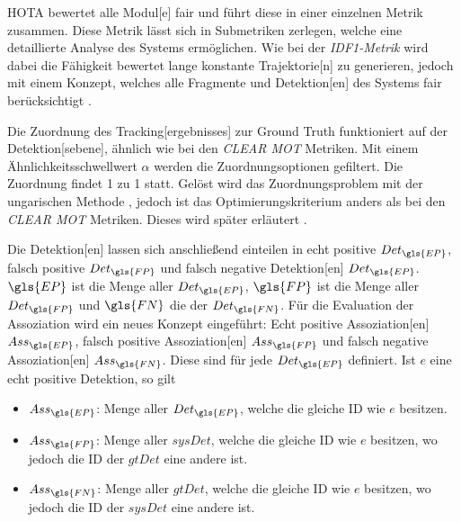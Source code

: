 \gls{HOTA} bewertet alle \gls{Modul}[e] fair und führt diese in einer einzelnen Metrik zusammen. Diese Metrik lässt sich in Submetriken zerlegen, welche eine detaillierte Analyse des Systems ermöglichen. Wie bei der \textit{\gls{IDF1}-Metrik} wird dabei die Fähigkeit bewertet lange konstante \gls{Trajektorie}[n] zu generieren, jedoch mit einem Konzept, welches alle Fragmente und \gls{Detektion}[en] des Systems fair berücksichtigt \cite{HOTA}. \par

Die Zuordnung des \gls{Tracking}[ergebnisses] zur \gls{Ground Truth} funktioniert auf der \gls{Detektion}[sebene], ähnlich wie bei den \textit{\acrshort{CLEAR} \gls{MOT}} Metriken. Mit einem Ähnlichkeitsschwellwert \(\alpha\) werden die Zuordnungsoptionen gefiltert. Die Zuordnung findet 1 zu 1 statt. Gelöst wird das Zuordnungsproblem mit der ungarischen Methode \cite{Kuhn.1955}, jedoch ist das Optimierungskriterium anders als bei den \textit{\acrshort{CLEAR} \gls{MOT}} Metriken. Dieses wird später erläutert \cite{HOTA}. \par

Die \gls{Detektion}[en] lassen sich anschließend einteilen in echt positive \(Det_{\gls{EP}}\), falsch positive \(Det_{\gls{FP}}\) und falsch negative \gls{Detektion}[en] \(Det_{\gls{EP}}\). \(\gls{EP}\) ist die Menge aller \(Det_{\gls{EP}}\), \(\gls{FP}\) ist die Menge aller \(Det_{\gls{FP}}\) und \(\gls{FN}\) die der \(Det_{\gls{FN}}\). Für die Evaluation der \gls{Assoziation} wird ein neues Konzept eingeführt: Echt positive \gls{Assoziation}[en] \(Ass_{\gls{EP}}\), falsch positive \gls{Assoziation}[en] \(Ass_{\gls{FP}}\) und falsch negative \gls{Assoziation}[en] \(Ass_{\gls{FN}}\). Diese sind für jede \(Det_{\gls{EP}}\) definiert. Ist \(e\) eine echt positive \gls{Detektion}, so gilt

\begin{itemize}
    \item \(Ass_{\gls{EP}}\): Menge aller \(Det_{\gls{EP}}\), welche die gleiche \acrshort{ID} wie \(e\) besitzen.
    \item \(Ass_{\gls{FP}}\): Menge aller \(sysDet\), welche die gleiche \acrshort{ID} wie \(e\) besitzen, wo jedoch die \acrshort{ID} der \(gtDet\) eine andere ist.
    \item \(Ass_{\gls{FN}}\): Menge aller \(gtDet\), welche die gleiche \acrshort{ID} wie \(e\) besitzen, wo jedoch die \acrshort{ID} der \(sysDet\) eine andere ist.
\end{itemize}

